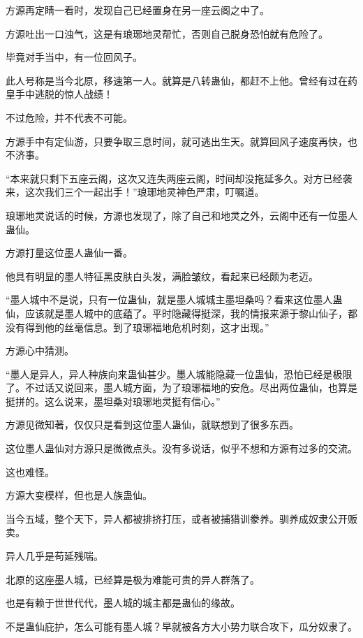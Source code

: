 
\begin{this_body}

方源再定睛一看时，发现自己已经置身在另一座云阁之中了。

方源吐出一口浊气，这是有琅琊地灵帮忙，否则自己脱身恐怕就有危险了。

毕竟对手当中，有一位回风子。

此人号称是当今北原，移速第一人。就算是八转蛊仙，都赶不上他。曾经有过在药皇手中逃脱的惊人战绩！

不过危险，并不代表不可能。

方源手中有定仙游，只要争取三息时间，就可逃出生天。就算回风子速度再快，也不济事。

“本来就只剩下五座云阁，这次又连失两座云阁，时间却没拖延多久。对方已经袭来，这次我们三个一起出手！”琅琊地灵神色严肃，叮嘱道。

琅琊地灵说话的时候，方源也发现了，除了自己和地灵之外，云阁中还有一位墨人蛊仙。

方源打量这位墨人蛊仙一番。

他具有明显的墨人特征黑皮肤白头发，满脸皱纹，看起来已经颇为老迈。

“墨人城中不是说，只有一位蛊仙，就是墨人城城主墨坦桑吗？看来这位墨人蛊仙，应该就是墨人城中的底蕴了。平时隐藏得挺深，我的情报来源于黎山仙子，都没有得到他的丝毫信息。到了琅琊福地危机时刻，这才出现。”

方源心中猜测。

“墨人是异人，异人种族向来蛊仙甚少。墨人城能隐藏一位蛊仙，恐怕已经是极限了。不过话又说回来，墨人城方面，为了琅琊福地的安危。尽出两位蛊仙，也算是挺拼的。这么说来，墨坦桑对琅琊地灵挺有信心。”

方源见微知著，仅仅只是看到这位墨人蛊仙，就联想到了很多东西。

这位墨人蛊仙对方源只是微微点头。没有多说话，似乎不想和方源有过多的交流。

这也难怪。

方源大变模样，但也是人族蛊仙。

当今五域，整个天下，异人都被排挤打压，或者被捕猎训豢养。驯养成奴隶公开贩卖。

异人几乎是苟延残喘。

北原的这座墨人城，已经算是极为难能可贵的异人群落了。

也是有赖于世世代代，墨人城的城主都是蛊仙的缘故。

不是蛊仙庇护，怎么可能有墨人城？早就被各方大小势力联合攻下，瓜分奴隶了。


\end{this_body}
